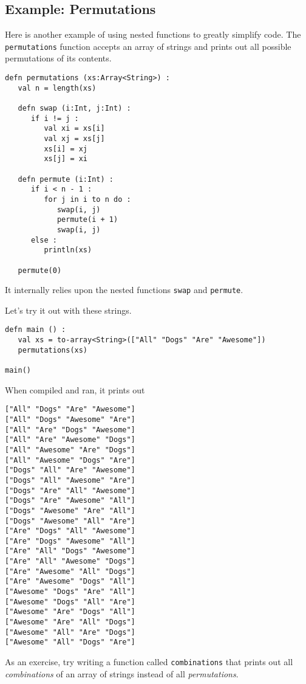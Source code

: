 \documentclass[10pt,oneside]{book}
\begin{document}
\subsection*{Example: Permutations}
Here is another example of using nested functions to greatly simplify code. The \texttt{\frenchspacing permutations} function accepts an array of strings and prints out all possible permutations of its contents. 
\begin{lstlisting}
defn permutations (xs:Array<String>) :
   val n = length(xs)
   
   defn swap (i:Int, j:Int) :
      if i != j :
         val xi = xs[i]
         val xj = xs[j]
         xs[i] = xj
         xs[j] = xi
      
   defn permute (i:Int) :
      if i < n - 1 :
         for j in i to n do :
            swap(i, j)
            permute(i + 1)
            swap(i, j)
      else :
         println(xs)

   permute(0)
\end{lstlisting}
It internally relies upon the nested functions \texttt{\frenchspacing swap} and \texttt{\frenchspacing permute}. 

Let's try it out with these strings.
\begin{lstlisting}
defn main () :
   val xs = to-array<String>(["All" "Dogs" "Are" "Awesome"])
   permutations(xs)

main()
\end{lstlisting}

When compiled and ran, it prints out
\begin{lstlisting}
["All" "Dogs" "Are" "Awesome"]
["All" "Dogs" "Awesome" "Are"]
["All" "Are" "Dogs" "Awesome"]
["All" "Are" "Awesome" "Dogs"]
["All" "Awesome" "Are" "Dogs"]
["All" "Awesome" "Dogs" "Are"]
["Dogs" "All" "Are" "Awesome"]
["Dogs" "All" "Awesome" "Are"]
["Dogs" "Are" "All" "Awesome"]
["Dogs" "Are" "Awesome" "All"]
["Dogs" "Awesome" "Are" "All"]
["Dogs" "Awesome" "All" "Are"]
["Are" "Dogs" "All" "Awesome"]
["Are" "Dogs" "Awesome" "All"]
["Are" "All" "Dogs" "Awesome"]
["Are" "All" "Awesome" "Dogs"]
["Are" "Awesome" "All" "Dogs"]
["Are" "Awesome" "Dogs" "All"]
["Awesome" "Dogs" "Are" "All"]
["Awesome" "Dogs" "All" "Are"]
["Awesome" "Are" "Dogs" "All"]
["Awesome" "Are" "All" "Dogs"]
["Awesome" "All" "Are" "Dogs"]
["Awesome" "All" "Dogs" "Are"]
\end{lstlisting}

As an exercise, try writing a function called \texttt{\frenchspacing combinations} that prints out all {\em combinations} of an array of strings instead of all {\em permutations}. 
\end{document}
